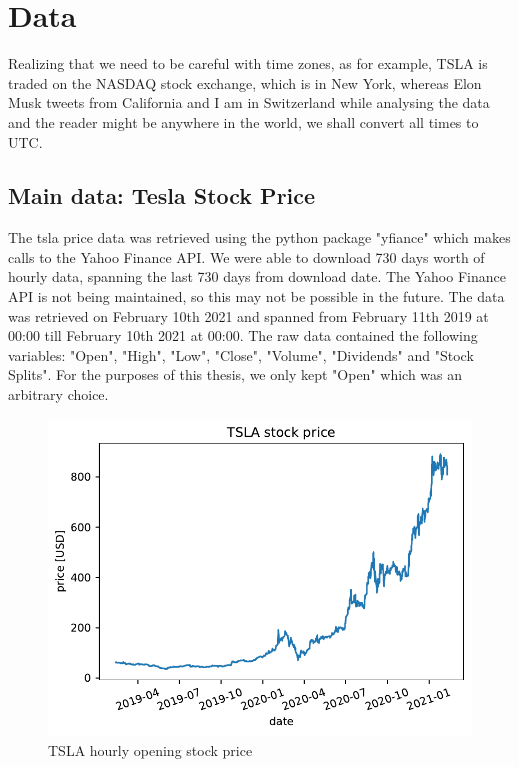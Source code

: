 \chapter{Data}
Realizing that we need to be careful with time zones, as for example, TSLA is traded on the NASDAQ stock exchange, which is in New York, whereas Elon Musk tweets from California and I am in Switzerland while analysing the data and the reader might be anywhere in the world, we shall convert all times to UTC.
\section{Main data: Tesla Stock Price}
The \acrshort{tsla} price data was retrieved using the python package "yfiance" which makes calls to the Yahoo Finance \Gls{API}. We were able to download 730 days worth of hourly data, spanning the last 730 days from download date. The Yahoo Finance \Gls{API} is not being maintained, so this may not be possible in the future. The data was retrieved on February 10th 2021 and spanned from February 11th 2019 at 00:00 till February 10th 2021 at 00:00.
The raw data contained the following variables: "Open", "High", "Low", "Close", "Volume", "Dividends" and "Stock Splits".
For the purposes of this thesis, we only kept "Open" which was an arbitrary choice.

\begin{figure}[h]
	\centering
	\includegraphics[width=\textwidth]{img/img_tsla.pdf}
	\caption{TSLA hourly opening stock price}
	\label{fig:tsla_open}
\end{figure}



